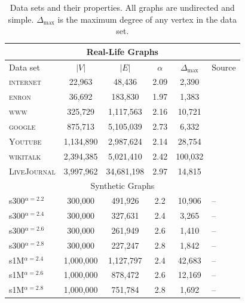 \begin{table}[!ht]
\centering
\small
\begin{tabular}{lccccl}\hline
\multicolumn{6}{c}{Real-Life Graphs}\\\hline
Data set  & $\vert V \vert$ & $\vert E\vert$ & $\alpha$  & $\Delta_{\max}$ & Source\\\hline
\textsc{internet} &  22,963        &    48,436      & 2.09     & 2,390        & \cite{newman}\\
\textsc{enron}    &  36,692        &   183,830      & 1.97    &1,383         & \cite{leskovec2009community}\\
\textsc{www}      & 325,729        & 1,117,563     & 2.16 & 10,721            & \cite{albert1999internet}\\
\textsc{google} & 875,713 & 5,105,039 & 2.73 & 6,332 & \cite{leskovec2009community}\\
\textsc{Youtube} & 1,134,890 & 2,987,624 & 2.14 & 28,754 & \cite{yang2015defining}\\
\textsc{wikitalk} & 2,394,385 & 5,021,410 & 2.42 & 100,032 & \cite{leskovec2010predicting}\\
\textsc{LiveJournal} &  3,997,962        &    34,681,198      & 2.97     & 14,815        & \cite{yang2015defining}\\\hline


\multicolumn{6}{c}{Synthetic Graphs}\\\hline
s300$^{\alpha=2.2}$    & 300,000        & 491,926        & 2.2    & 10,906 & --\\
s300$^{\alpha=2.4}$    & 300,000        & 327,631        & 2.4    & 3,265 & --\\
s300$^{\alpha=2.6}$    & 300,000        & 261,949        & 2.6    & 1,410 & --\\
s300$^{\alpha=2.8}$    & 300,000        & 227,247        & 2.8    & 1,842 & --\\
s1M$^{\alpha=2.4}$    & 1,000,000       & 1,127,797      & 2.4    & 42,683 &-- \\
s1M$^{\alpha=2.6}$    & 1,000,000       & 878,472        & 2.6    & 12,169 &-- \\
s1M$^{\alpha=2.8}$    & 1,000,000       & 751,784         & 2.8   & 1,692  &-- \\\hline
\end{tabular}
\caption{Data sets and their properties. All graphs are undirected and simple. $\Delta_{\max}$ is the maximum degree of any vertex in the data set.}
\label{t:datasets}
\end{table}


